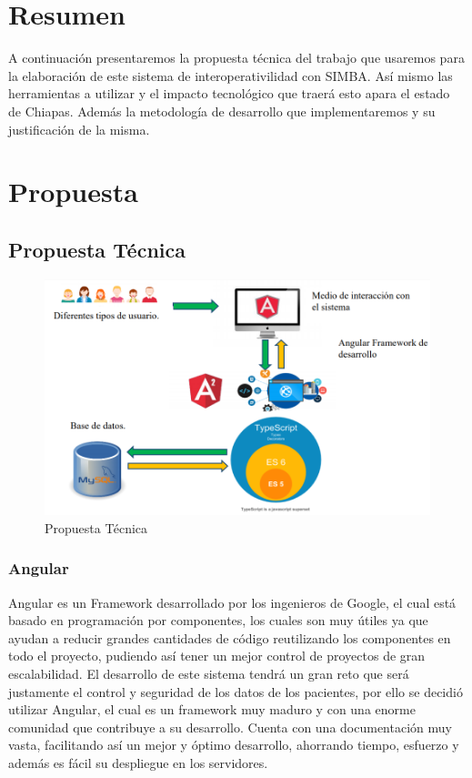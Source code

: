 \chapter*{Resumen}
A continuación presentaremos la propuesta técnica del trabajo que usaremos para la elaboración de este sistema de interoperativilidad con SIMBA. Así mismo las herramientas a utilizar y el impacto tecnológico que traerá esto apara el estado de Chiapas. Además la metodología de desarrollo que implementaremos y su justificación de la misma.

\chapter{Propuesta} \label{sec:propuesta}

\section{Propuesta Técnica}

\begin{figure}[h]
  \label{propuesta}
  \centering
  \includegraphics[scale=.5]{lib/assets/propuesta-tecnica}
  \caption{Propuesta Técnica}
\end{figure}

\subsection{Angular }
Angular es un Framework desarrollado por los ingenieros de Google, el cual está basado en programación por componentes, los cuales son muy útiles ya que ayudan a reducir grandes cantidades de código reutilizando los componentes en todo el proyecto, pudiendo así tener un mejor control de proyectos de gran escalabilidad. El desarrollo de este sistema tendrá un gran reto que será justamente el control y seguridad de los datos de los pacientes, por ello se decidió utilizar Angular, el cual es un framework muy maduro y con una enorme comunidad que contribuye a su desarrollo. Cuenta con una documentación muy vasta, facilitando así un mejor y óptimo desarrollo, ahorrando tiempo, esfuerzo y además es fácil su despliegue en los servidores. \cite{Angular}


